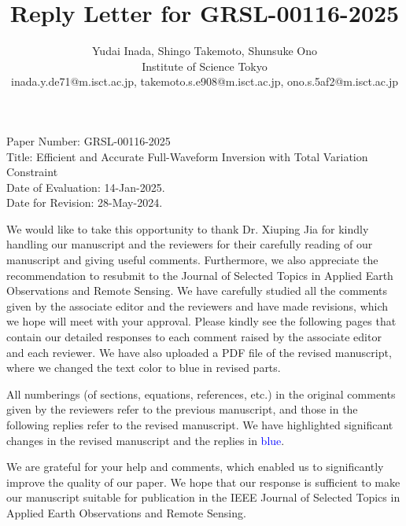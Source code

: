 \documentclass[a4paper,twocolumn]{article}
\title{Reply Letter for GRSL-00116-2025}
\author{%
	Yudai Inada, Shingo Takemoto, Shunsuke Ono\\
	Institute of Science Tokyo\\
	inada.y.de71@m.isct.ac.jp, takemoto.s.e908@m.isct.ac.jp, ono.s.5af2@m.isct.ac.jp\\
}
\begin{document}
\onecolumn
\maketitle
\begin{flushleft}
	Paper Number: GRSL-00116-2025\\
	Title: Efficient and Accurate Full-Waveform Inversion with Total Variation Constraint\\
	Date of Evaluation: 14-Jan-2025.\\
	Date for Revision: 28-May-2024.\\
\end{flushleft}

We would like to take this opportunity to thank Dr. Xiuping Jia
for kindly handling our manuscript and the reviewers for their carefully reading of our manuscript and giving useful comments.
Furthermore, we also appreciate the recommendation to resubmit to the Journal of Selected Topics in Applied Earth Observations and Remote Sensing.
We have carefully studied all the comments given by the associate editor and the reviewers and have made revisions,
which we hope will meet with your approval.
Please kindly see the following pages that contain our detailed responses to each comment raised by the associate editor and each reviewer.
We have also uploaded a PDF file of the revised manuscript,
where we changed the text color to blue in revised parts.

All numberings (of sections, equations, references, etc.) in the original comments given by the reviewers refer to the previous manuscript, and those in the following replies refer to the revised manuscript. We have highlighted significant changes in the revised manuscript and the replies in \textcolor{blue}{blue}.

We are grateful for your help and comments, which enabled us to significantly improve the quality of our paper.
We hope that our response is sufficient to make our manuscript suitable for publication in the IEEE Journal of Selected Topics in Applied Earth Observations and Remote Sensing.

\twocolumn
\clearpage
%	
	
\end{document}
